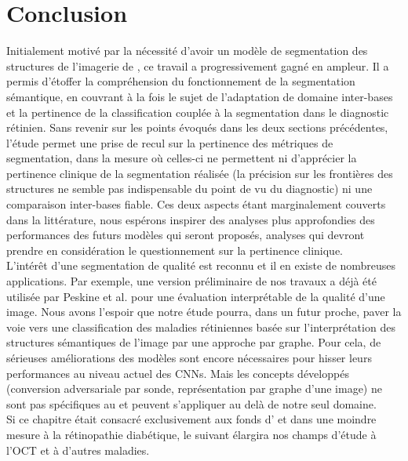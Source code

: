 \section{Conclusion}
Initialement motivé par la nécessité d'avoir un modèle de segmentation des structures de l'imagerie de \fundus{}, ce travail a progressivement gagné en ampleur. Il a permis d'étoffer la compréhension du fonctionnement de la segmentation sémantique, en couvrant à la fois le sujet de l'adaptation de domaine inter-bases et la pertinence de la classification couplée à la segmentation dans le diagnostic rétinien. Sans revenir sur les points évoqués dans les deux sections précédentes,  l'étude permet une prise de recul sur la pertinence des métriques de segmentation, dans la mesure où celles-ci ne permettent ni d'apprécier la pertinence clinique de la segmentation réalisée (la précision sur les frontières des structures ne semble pas indispensable du point de vu du diagnostic) ni une comparaison inter-bases fiable. Ces deux aspects étant marginalement couverts dans la littérature, nous espérons inspirer des analyses plus approfondies des performances des futurs modèles qui seront proposés, analyses qui devront prendre en considération le questionnement sur la pertinence clinique. \\
L'intérêt d'une segmentation de qualité est reconnu et il en existe de nombreuses applications. Par exemple, une version préliminaire de nos travaux a déjà été utilisée par Peskine et al. \cite{peskineInterpretableDataDrivenScore2020} pour une évaluation interprétable de la qualité d'une image. Nous avons l'espoir que notre étude pourra, dans un futur proche, paver la voie vers une classification des maladies rétiniennes basée sur l'interprétation des structures sémantiques de l'image par une approche par graphe. Pour cela, de sérieuses améliorations des modèles sont encore nécessaires pour hisser leurs performances au niveau actuel des CNNs. Mais les concepts développés (conversion adversariale par sonde, représentation par graphe d'une image) ne sont pas spécifiques au \fundus{} et peuvent s'appliquer au delà de notre seul domaine. \\
Si ce chapitre était consacré exclusivement aux fonds d'\oeil{} et dans une moindre mesure à la rétinopathie diabétique, le suivant élargira nos champs d'étude à l'OCT et à d'autres maladies.

